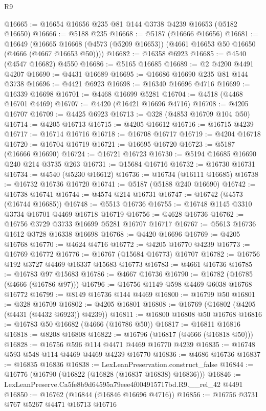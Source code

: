 \begin{lexlean}{R9}
\begin{coremodule}
@16665 := @16654 @16656 @235 @81 @144 @3738 @4239 @16653 (@5182 @16650)
@16666 := @5188 @235
@16668 := @5187 (@16666 @16656)
@16681 := @16649
    (@16665 @16668 (@4573 (@5209 @16653)) (@4661 @16653 @50 @16650 (@4666 (@4667 @16653 @50))))
@16682 := @16358 @6923
@16685 := @4540 (@4547 @16682) @4550
@16686 := @5165 @16685
@16689 := @2 @4200 @4491 @4207
@16690 := @4431 @16689
@16695 := @16686 @16690 @235 @81 @144 @3738
@16696 := @4421 @6923
@16698 := @16340 @16696 @4716
@16699 := @16339 @16698
@16701 := @4468 @16699 @5281
@16704 := @4518 (@4468 @16701 @4469)
@16707 := @4420 (@16421 @16696 @4716)
@16708 := @4205 @16707
@16709 := @4425 @6923
@16713 := @328 (@4853 @16709 @104 @50)
@16714 := @4205 @16713
@16715 := @4205 @16612
@16716 := @16715 @4239
@16717 := @16714 @16716
@16718 := @16708 @16717
@16719 := @4204 @16718
@16720 := @16704 @16719
@16721 := @16695 @16720
@16723 := @5187 (@16666 @16690)
@16724 := @16721 @16723
@16730 := @5194 @16685 @16690 @240 @214 @3735 @263
@16731 := @15684 @16716
@16732 := @16730 @16731
@16734 := @4540 (@5230 @16612)
@16736 := @16734 (@16111 @16685)
@16738 := @16732 @16736 @16720
@16741 := @5187 (@5188 @240 @16690)
@16742 := @16738 @16741
@16744 := @4574 @214 @16731
@16747 := @16742 (@4573 (@16744 @16685))
@16748 := @5513 @16736
@16755 := @16748 @1145 @3310 @3734 @16701 @4469 @16718 @16719
@16756 := @4628 @16736
@16762 := @16756 @3729 @3733 @16699 @5281 @16707 @16717
@16767 := @5613 @16736 @1612 @3728 @16338 @16698
@16768 := @4420 @16696
@16769 := @4205 @16768
@16770 := @4624 @4716
@16772 := @4205 @16770 @4239
@16773 := @16769 @16772
@16776 := @16767 (@15684 @16773) @16707
@16782 := @16756 @192 @3727 @4469 @16337 @15683 @16773
@16783 := @4661 @16736
@16785 := @16783 @97 @15683
@16786 := @4667 @16736
@16790 := @16782 (@16785 (@4666 (@16786 @97)))
@16796 := @16756 @1149 @598 @4469 @6038 @16768 @16772
@16799 := @8149 @16736 @144 @4469
@16800 := @16799 @50
@16801 := @328 @16709
@16802 := @4205 @16801
@16808 := @16769 (@16802 (@4205 (@4431 (@4432 @6923)) @4239))
@16811 := @16800 @16808 @50 @16768
@16816 := @16783 @50 @16682 (@4666 (@16786 @50))
@16817 := @16811 @16816
@16818 := @8208 @16808
@16822 := @16796 (@16817 (@4666 (@16818 @50)))
@16828 := @16756 @596 @114 @4471 @4469 @16770 @4239
@16835 := @16748 @593 @548 @114 @4469 @4469 @4239 @16770
@16836 := @4686 @16736
@16837 := @16835 @16836
@16838 := LexLeanPreservation.construct_false
@16844 := @16776 (@16790 (@16822 (@16828 (@16837 @16838) @16836)))
@16846 := LexLeanPreserve.Ca5fe8b9d64595a79eee4f004915717bd.R9.__rel_42 @4491
@16850 := @16762 (@16844 (@16846 @16696 @4716))
@16856 := @16756 @3731 @767 @5267 @4471 @16713 @16716

\end{coremodule}
\end{lexlean}
